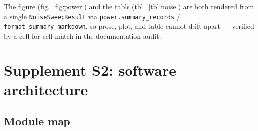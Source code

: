 \documentclass[
]{article}
\begin{document}
The figure (fig.~\ref{fig:power}) and the table (tbl.~\ref{tbl:noise})
are both rendered from a single \texttt{NoiseSweepResult} via
\texttt{power.summary\_records} / \texttt{format\_summary\_markdown}, so
prose, plot, and table cannot drift apart --- verified by a
cell-for-cell match in the documentation audit.

\section{Supplement S2: software architecture}\label{sec:software}

\subsection{Module map}\label{module-map}
\end{document}
